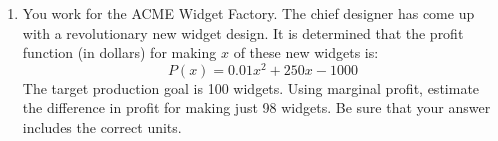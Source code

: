 \documentclass[letterpaper,12pt,fleqn]{article}
\begin{document}
\begin{enumerate}[left=0pt]
  \bigskip

\item You work for the ACME Widget Factory.  The chief designer has come up with a revolutionary new widget design.  It is
  determined that the profit function (in dollars) for making \(x\) of these new widgets is:
  \[P(x)=0.01x^2+250x-1000\]
  The target production goal is 100 widgets.  Using marginal profit, estimate the difference in profit for making just 98
  widgets.  Be sure that your answer includes the correct units.
\end{enumerate}
\end{document}
